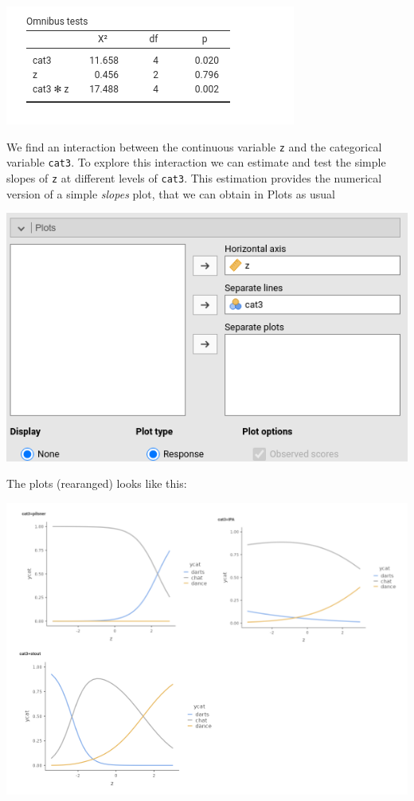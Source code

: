 \documentclass[
]{book}
\begin{document}
\includegraphics{bookletpics/3_multi_output8.png}

We find an interaction between the continuous variable \texttt{z} and the categorical variable \texttt{cat3}. To explore this interaction we can estimate and test the simple slopes of \texttt{z} at different levels of \texttt{cat3}. This estimation provides the numerical version of a simple \emph{slopes} plot, that we can obtain in {Plots} as usual

\includegraphics{bookletpics/3_multi_input2.png}

The plots (rearanged) looks like this:

\includegraphics{bookletpics/3_multi_output9.png}
\end{document}

